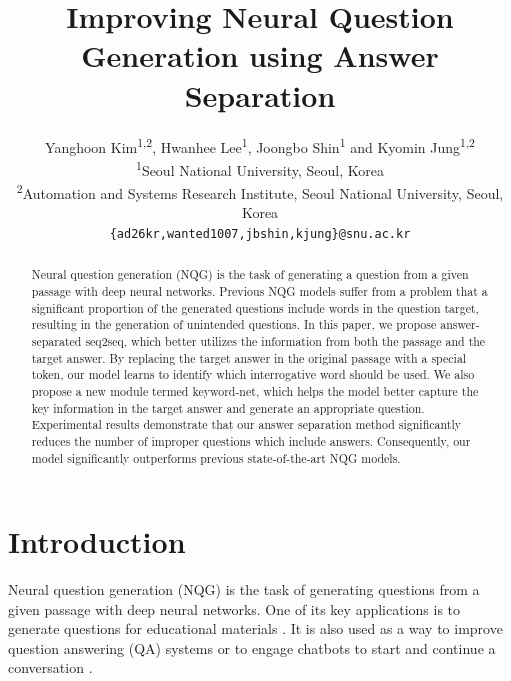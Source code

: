\documentclass[letterpaper]{article} %
\begin{document}
\title{Improving Neural Question Generation using Answer Separation}
\author{Yanghoon Kim\textsuperscript{1,2}, Hwanhee Lee\textsuperscript{1}, Joongbo Shin\textsuperscript{1} and Kyomin Jung\textsuperscript{1,2}\\
\textsuperscript{1}Seoul National University, Seoul, Korea \\
\textsuperscript{2}Automation and Systems Research Institute, Seoul National University, Seoul, Korea\\
{\tt \{ad26kr,wanted1007,jbshin,kjung\}@snu.ac.kr} \\
}
\maketitle
\begin{abstract}
Neural question generation (NQG) is the task of generating a question from a given passage with deep neural networks. Previous NQG models suffer from a problem that a significant proportion of the generated questions include words in the question target, resulting in the generation of unintended questions. In this paper, we propose answer-separated seq2seq, which better utilizes the information from both the passage and the target answer. By replacing the target answer in the original passage with a special token, our model learns to identify which interrogative word should be used.
We also propose a new module termed keyword-net, which helps the model better capture the key information in the target answer and generate an appropriate question. Experimental results demonstrate that our answer separation method significantly reduces the number of  improper questions which include answers. Consequently, our model significantly outperforms previous state-of-the-art NQG models.


\end{abstract}

\section{Introduction}

\noindent Neural question generation (NQG) is the task of generating questions from a given passage with deep neural networks.
One of its key applications is to generate questions for educational materials \cite{heilman2010good}. It is also used as a way to improve question answering (QA) systems \cite{duan2017question,tang2017question,tang2018learning} or to engage chatbots to start and continue a conversation \cite{mostafazadeh2016generating}.
\end{document}
